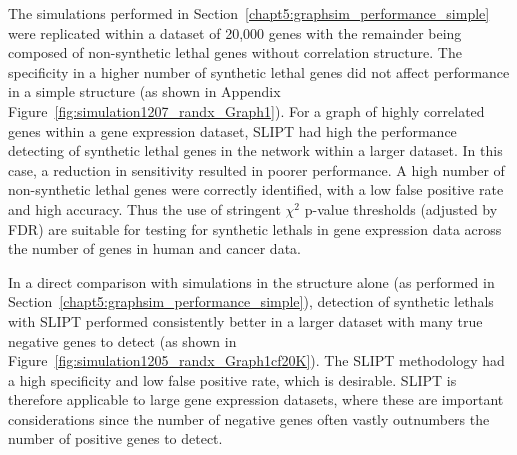 


The simulations performed in Section~\ref{chapt5:graphsim_performance_simple} were replicated within a dataset of 20,000 genes with the remainder being composed of non-synthetic lethal genes without correlation structure. The specificity in a higher number of \gls{synthetic lethal} genes did not affect performance in a simple  structure (as shown in Appendix Figure~\ref{fig:simulation1207_randx_Graph1}). For a graph of highly correlated genes within a \gls{gene expression} dataset, \gls{SLIPT} had high the performance detecting of \gls{synthetic lethal} genes in the network within a larger dataset. In this case, a reduction in sensitivity resulted in poorer performance. A high number of non-synthetic lethal genes were correctly identified, with a low false positive rate and high accuracy. Thus the use of stringent $\chi^2$ p-value thresholds (adjusted by \gls{FDR}) are suitable for testing for \glspl{synthetic lethal} in \gls{gene expression} data across the number of genes in human and cancer data.

In a direct comparison with simulations in the  structure alone (as performed in Section~\ref{chapt5:graphsim_performance_simple}), detection of \glspl{synthetic lethal} with \gls{SLIPT} performed consistently better in a larger dataset with many true negative genes to detect (as shown in Figure~\ref{fig:simulation1205_randx_Graph1cf20K}). The \gls{SLIPT} methodology had a high specificity and low false positive rate, which is desirable. \gls{SLIPT} is therefore applicable to large \gls{gene expression} datasets, where these are important considerations since the number of negative genes often vastly outnumbers the number of positive genes to detect.


